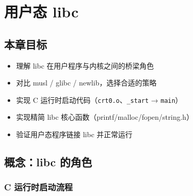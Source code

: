 \chapter{用户态 libc}
\label{ch:libc}

\section{本章目标}

\begin{itemize}
  \item 理解 libc 在用户程序与内核之间的桥梁角色
  \item 对比 musl / glibc / newlib，选择合适的策略
  \item 实现 C 运行时启动代码（\texttt{crt0.o}、\texttt{\_start} → \texttt{main}）
  \item 实现精简 libc 核心函数（printf/malloc/fopen/string.h）
  \item 验证用户态程序链接 libc 并正常运行
\end{itemize}

\section{概念：libc 的角色}
\label{sec:libc-concept}


\subsection{C 运行时启动流程}

